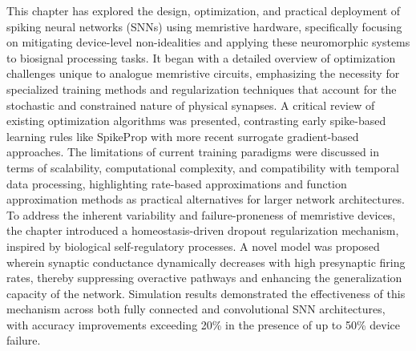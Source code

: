 
\noindent This chapter has explored the design, optimization, and practical deployment of spiking neural networks (SNNs) using memristive hardware, specifically focusing on mitigating device-level non-idealities and applying these neuromorphic systems to biosignal processing tasks. It began with a detailed overview of optimization challenges unique to analogue memristive circuits, emphasizing the necessity for specialized training methods and regularization techniques that account for the stochastic and constrained nature of physical synapses. A critical review of existing optimization algorithms was presented, contrasting early spike-based learning rules like SpikeProp with more recent surrogate gradient-based approaches. The limitations of current training paradigms were discussed in terms of scalability, computational complexity, and compatibility with temporal data processing, highlighting rate-based approximations and function approximation methods as practical alternatives for larger network architectures.\\


\noindent To address the inherent variability and failure-proneness of memristive devices, the chapter introduced a homeostasis-driven dropout regularization mechanism, inspired by biological self-regulatory processes. A novel model was proposed wherein synaptic conductance dynamically decreases with high presynaptic firing rates, thereby suppressing overactive pathways and enhancing the generalization capacity of the network. Simulation results demonstrated the effectiveness of this mechanism across both fully connected and convolutional SNN architectures, with accuracy improvements exceeding 20\% in the presence of up to 50\% device failure.\\

